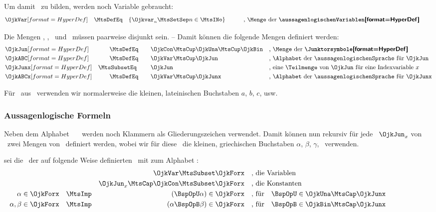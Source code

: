 Um damit \Formeln\ zu bilden, werden noch Variable gebraucht:
\begin{align}
& \defSym{\OjkVar}  & \MtsDefEq \quad & \MengeDef{\Ojkvar_n}{n \in \MtsINo}
&&&&
&& \text{, \Menge\ der \defTxt{\aussagenlogischenVariablen}} \label{def:OjkVar}
&&
\end{align}

Die Mengen \OjkCon, \OjkUna, \OjkBin\ und \OjkVar\ müssen paarweise disjunkt sein.
-- Damit können die folgende Mengen definiert werden:
\begin{align}
& \defSym{\OjkJun}  & \MtsDefEq      \qquad & \OjkCon \MtsCup \OjkUna \MtsCup \OjkBin
&& \text{, \Menge\ der \defTxt{\Junktorsymbole}}
\label{def:OjkJun}
\\
& \defSym{\OjkABC}  & \MtsDefEq      \qquad & \OjkVar \MtsCup \OjkJun
&& \text{, \Alphabet\ der \aussagenlogischenSprache\ für } \OjkJun
\label{def:OjkABC}
\\
& \defSym{\OjkJunx} & \MtsSubsetEq\; \qquad & \OjkJun
&& \text{, eine \Teilmenge\ von } \OjkJun \text{ für eine Indexvariable } x
\label{def:OjkJunx}
\\
& \defSym{\OjkABCx} & \MtsDefEq      \qquad & \OjkVar \MtsCup \OjkJunx \quad
&& \text{, \Alphabet\ der \aussagenlogischenSprache\ für } \OjkJunx
\label{def:OjkABCx}
\end{align}

Für \Elemente\ aus \OjkVar\ verwenden wir normalerweise die kleinen, lateinischen Buchstaben $a$, $b$, $c$, usw.

\subsubsection{Aussagenlogische Formeln}%
\label                  {subsub:Formeln}

Neben dem Alphabet \OjkABC\ \textbzw\ \OjkABCx\ werden noch Klammern als Gliederungszeichen verwendet.
Damit können nun rekursiv für jede \Teilmenge\ $\OjkJun_x$ von \OjkJun\ zwei Mengen von \aussagenlogischenFormeln\ definiert werden, wobei wir für diese \Formeln\ die kleinen, griechischen Buchstaben $\alpha$, $\beta$, $\gamma$, \textusw\ verwenden.

 sei die \Menge\ der auf folgende Weise definierten \ mit  zum Alphabet :
\begin{align}
&                    & \OjkVar                    \MtsSubset \OjkForx
&&& \text{, die Variablen}  \label{def:ForQ}
\\
&                    & \OjkJun_x \MtsCap \OjkCon   \MtsSubset \OjkForx
&&& \text{, die Konstanten} \label{def:ForJK}
\\
\alpha \in\OjkForx & \quad\MtsImp & (\BspOpU\alpha)\in\OjkForx
&&& \text{, für} \quad \BspOpU \in \OjkUna \MtsCap \OjkJunx
\label{def:ForU}
\\
\alpha,\beta\in\OjkForx & \quad\MtsImp & (\alpha\BspOpB\beta) \in\OjkForx
&&& \text{, für} \quad \BspOpB  \in \OjkBin \MtsCap \OjkJunx
\label{def:ForB}
\formulatoleft
\end{align}

